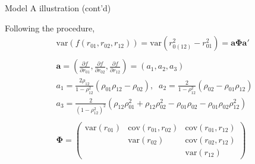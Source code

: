 \documentclass[10pt,pdf]{beamer}
\newcommand{\var}{\mathrm{var}}
\newcommand{\cov}{\mathrm{cov}}
\renewcommand{\vec}[1]{\mathbf{#1}}
\begin{document}

\begin{frame}[t]{Model A illustration (cont’d)}

Following the procedure,
\begin{gather*}
  \var(f(r_{01}, r_{02}, r_{12})) = \var(r_{0(12)}^2 - r_{01}^2) = \vec{a} \boldsymbol{\Phi} \vec{a}' \\
  \\
  \vec{a} = \left( \frac{\partial f}{\partial r_{01}}, \frac{\partial f}{\partial r_{02}}, \frac{\partial f}{\partial r_{12}} \right) = (a_1, a_2, a_3) \\
  a_1 = \frac{2 \rho_{12}}{1 - \rho_{12}^2} (\rho_{01} \rho_{12} - \rho_{02}), \;\; a_2 = \frac{2}{1 - \rho_{12}^2} (\rho_{02} - \rho_{01} \rho_{12}) \\
  a_3 = \frac{2}{(1 - \rho_{12}^2)^2} (\rho_{12} \rho_{01}^2 + \rho_{12} \rho_{02}^2 - \rho_{01} \rho_{02} - \rho_{01} \rho_{02} \rho_{12}^2) \\
  \\
  \boldsymbol{\Phi} =
  \left( \begin{array}{ccc}
    \var(r_{01}) & \cov(r_{01}, r_{02}) & \cov(r_{01}, r_{12}) \\
                 & \var(r_{02})         & \cov(r_{02}, r_{12}) \\
                 &                      & \var(r_{12})
  \end{array} \right)
\end{gather*}

\end{frame}

\end{document}

